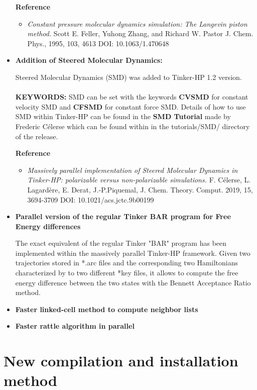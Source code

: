 \documentclass[]{article}
\begin{document}
\begin{itemize}
\textbf{Reference}

\begin{itemize}

\item {\em Constant pressure molecular dynamics simulation: The Langevin piston method.}
Scott E. Feller, Yuhong Zhang, and Richard W. Pastor J. Chem. Phys., 1995,  103, 4613 DOI: 10.1063/1.470648
\end{itemize}

\item \textbf{Addition of Steered Molecular Dynamics:}

Steered Molecular Dynamics (SMD) was added to Tinker-HP 1.2 version.\\\\
\textbf{KEYWORDS:} SMD can be set with the keywords \textbf{CVSMD} for constant velocity SMD and \textbf{CFSMD} for constant force SMD. Details of how to use SMD within Tinker-HP can be found in the \textbf{SMD Tutorial} made by Frederic Célerse which can be found within in the tutorials/SMD/ directory of the release.

\textbf{Reference}

\begin{itemize}
    \item {\em Massively parallel implementation of Steered Molecular Dynamics in Tinker-HP: polarizable versus non-polarizable simulations.}
F. Célerse, L. Lagardère, E. Derat, J.-P.Piquemal, J. Chem. Theory. Comput. 2019, 15, 3694-3709 DOI: 10.1021/acs.jctc.9b00199
\end{itemize}

\item \textbf{Parallel version of the regular Tinker BAR program for Free Energy differences}

The exact equivalent of the regular Tinker "BAR" program has been implemented within the massively parallel Tinker-HP framework. Given two trajectories stored in *.arc files and the corresponding two Hamiltonians characterized by to two different *key files, it allows to compute the free energy difference between the two states with the Bennett Acceptance Ratio method.
\item \textbf{Faster linked-cell method to compute neighbor lists}
\item \textbf{Faster rattle algorithm in parallel}
\end{itemize}
\section{New compilation and installation method}
\end{document}
